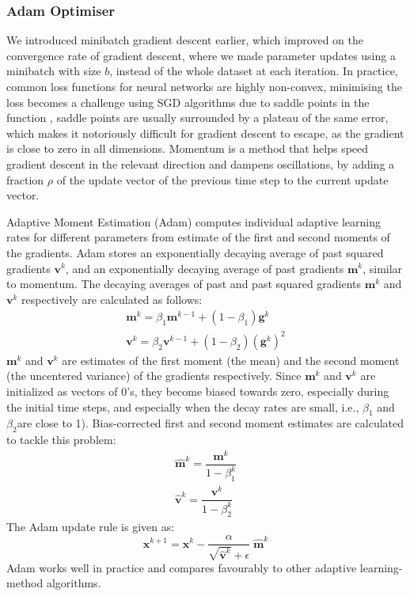 \documentclass{beamer}
\begin{document}
\begin{frame}[allowframebreaks]
\frametitle{Adam Optimiser}
We introduced minibatch  gradient descent earlier, which improved on the convergence rate of gradient descent, where we made parameter updates using a minibatch with size $b$, instead of the whole dataset at each iteration. In practice, common loss functions for neural networks are highly non-convex, minimising the loss becomes a challenge using SGD algorithms due to saddle points in the function {\cite{dauphin17e}}, saddle points are usually surrounded by a plateau of the same error, which makes it notoriously difficult for gradient descent to escape, as the gradient is close to zero in all dimensions. Momentum {\cite{qian1999momentum}} is a method that helps speed gradient descent in the relevant direction and dampens oscillations, by adding a fraction $\rho$ of the update vector of the previous time step to the current update vector. 

Adaptive Moment Estimation (Adam) {\cite{kingma2014adam}} computes individual adaptive learning rates for different parameters from estimate of the first and second moments of the gradients. Adam stores an exponentially decaying average of past squared gradients $\bm{v}^k$, and an exponentially decaying average of past gradients $\bm{m}^k$, similar to momentum. The decaying averages of past and past squared gradients $\bm{m}^k$ and $\bm{v}^k$ respectively are calculated as follows:
\begin{equation}\label{eqn:adam_mean}
\begin{array}{l}
\bm{m}^k = \beta_1\bm{m}^{k-1} + (1-\beta_1)\bm{g}^k \\
\bm{v}^k = \beta_2\bm{v}^{k-1} + (1-\beta_2)(\bm{g}^k)^2
\end{array}
\end{equation} 
$\bm{m}^k$ and $\bm{v}^k$ are estimates of the first moment (the mean) and the second moment (the uncentered variance) of the gradients respectively. Since $\bm{m}^k$ and $\bm{v}^k$ are initialized as vectors of $0$'s, they become biased towards zero, especially during the initial time steps, and especially when the decay rates are small, i.e., $\beta_1$ and $\beta_2$are close to 1). Bias-corrected first and second moment estimates are calculated to tackle this problem:
\begin{equation}\label{eqn:adam_bias}
\begin{array}{l}
\hat{\bm{m}}^k = \dfrac{\bm{m}^k}{1-\beta^k_1} \\
\hat{\bm{v}}^k = \dfrac{\bm{v}^k}{1-\beta^k_2}
\end{array}
\end{equation}
The Adam update rule is given as:
\begin{equation}\label{eqn:adam}
\bm{x}^{k+1} = \bm{x}^{k} - \dfrac{\alpha}{\sqrt{\hat{\bm{v}}^k} + \epsilon}\; \hat{\bm{m}}^k
\end{equation}
Adam works well in practice and compares favourably to other adaptive learning-method algorithms.
\end{frame}
\end{document}
